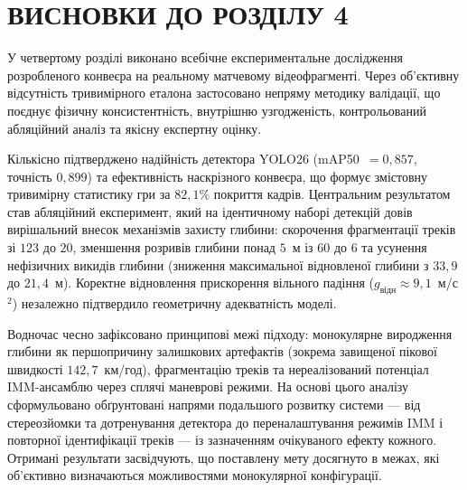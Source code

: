 \begin{unnumbered}

\section*{ВИСНОВКИ ДО РОЗДІЛУ 4}

У четвертому розділі виконано всебічне експериментальне дослідження розробленого конвеєра
на реальному матчевому відеофрагменті. Через об'єктивну відсутність тривимірного еталона
застосовано непряму методику валідації, що поєднує фізичну консистентність, внутрішню
узгодженість, контрольований абляційний аналіз та якісну експертну оцінку.

Кількісно підтверджено надійність детектора \gls{YOLO}26 (mAP50~$=0{,}857$, точність
$0{,}899$) та ефективність наскрізного конвеєра, що формує змістовну тривимірну статистику
гри за $82{,}1\%$ покриття кадрів. Центральним результатом став абляційний експеримент, який
на ідентичному наборі детекцій довів вирішальний внесок механізмів захисту глибини:
скорочення фрагментації треків зі $123$ до $20$, зменшення розривів глибини понад $5$~м із
$60$ до $6$ та усунення нефізичних викидів глибини (зниження максимальної відновленої
глибини з $33{,}9$ до $21{,}4$~м). Коректне відновлення прискорення вільного падіння
($g_{\text{відн}} \approx 9{,}1$~м/с$^2$) незалежно підтвердило геометричну адекватність моделі.

Водночас чесно зафіксовано принципові межі підходу: монокулярне виродження глибини як
першопричину залишкових артефактів (зокрема завищеної пікової швидкості $142{,}7$~км/год),
фрагментацію треків та нереалізований потенціал \gls{IMM}-ансамблю через сплячі маневрові
режими. На основі цього аналізу сформульовано обґрунтовані напрями подальшого розвитку
системи --- від стереозйомки та дотренування детектора до переналаштування режимів
\gls{IMM} і повторної ідентифікації треків --- із зазначенням очікуваного ефекту кожного.
Отримані результати засвідчують, що поставлену мету досягнуто в межах, які об'єктивно
визначаються можливостями монокулярної конфігурації.

\end{unnumbered}
